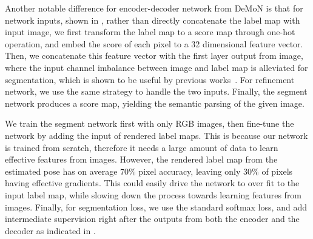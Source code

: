 Another notable difference for encoder-decoder network from DeMoN is that for network inputs, shown in , rather than directly concatenate the label map with input image, we first transform the label map to a score map through one-hot operation, and embed the score of each pixel to a 32 dimensional feature vector. 
Then, we concatenate this feature vector with the first layer output from image, where the input channel imbalance between image and label map is alleviated for segmentation, which is shown to be useful by previous works~\cite{eigen2015predicting}.
 For refinement network, we use the same strategy to handle the two inputs. Finally, the segment network produces a score map, yielding the semantic parsing of the given image.

We train the segment network first with only RGB images, then fine-tune the network by adding the input of rendered label maps. This is because our network is trained from scratch, therefore it needs a large amount of data to learn effective features from images. However, the rendered label map from the estimated pose has on average 70$\%$ pixel accuracy, leaving only 30$\%$ of pixels having effective gradients. This could easily drive the network to over fit to the input label map, while slowing down the process towards learning features from images. Finally, for segmentation loss, we use the standard softmax loss, and add intermediate supervision right after the outputs from both the encoder and the decoder as indicated in . 